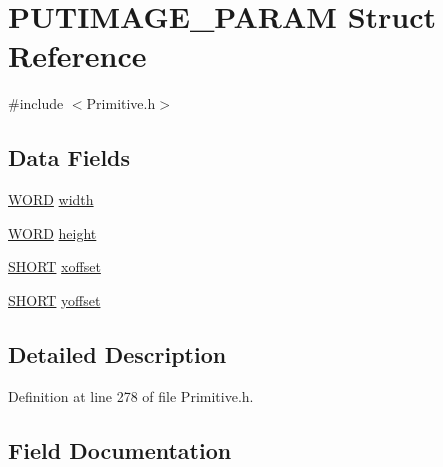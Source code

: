 \hypertarget{struct_p_u_t_i_m_a_g_e___p_a_r_a_m}{}\section{P\+U\+T\+I\+M\+A\+G\+E\+\_\+\+P\+A\+R\+A\+M Struct Reference}
\label{struct_p_u_t_i_m_a_g_e___p_a_r_a_m}


{\ttfamily \#include $<$Primitive.\+h$>$}

\subsection*{Data Fields}
\begin{DoxyCompactItemize}
\item 
\hyperlink{_generic_type_defs_8h_a2b0e863dadf920709ec53d9088ee7c91}{W\+O\+R\+D} \hyperlink{struct_p_u_t_i_m_a_g_e___p_a_r_a_m_a1fd31a71d8ffffeeacaa6eef4782ee24}{width}
\item 
\hyperlink{_generic_type_defs_8h_a2b0e863dadf920709ec53d9088ee7c91}{W\+O\+R\+D} \hyperlink{struct_p_u_t_i_m_a_g_e___p_a_r_a_m_a919b3b1495d055253ab29ef130f6d9cf}{height}
\item 
\hyperlink{_generic_type_defs_8h_ae9bb25d3afecf3bfab0fbe3c22c2050f}{S\+H\+O\+R\+T} \hyperlink{struct_p_u_t_i_m_a_g_e___p_a_r_a_m_a7fc8c844e703cb6583aac512ef974c46}{xoffset}
\item 
\hyperlink{_generic_type_defs_8h_ae9bb25d3afecf3bfab0fbe3c22c2050f}{S\+H\+O\+R\+T} \hyperlink{struct_p_u_t_i_m_a_g_e___p_a_r_a_m_ab3eff91c1fe4033ba936e0859ba092da}{yoffset}
\end{DoxyCompactItemize}


\subsection{Detailed Description}


Definition at line 278 of file Primitive.\+h.



\subsection{Field Documentation}
\hypertarget{struct_p_u_t_i_m_a_g_e___p_a_r_a_m_a919b3b1495d055253ab29ef130f6d9cf}{}
